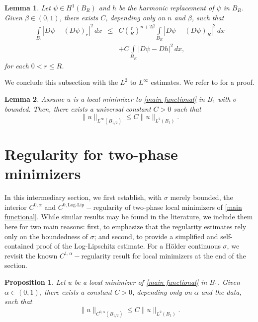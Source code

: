 \documentclass[reqno,11pt]{amsart}
\newtheorem{lemma}{Lemma}[section]
\newtheorem{proposition}{Proposition}[section]
\newcommand{\1}{\mathds{1}}  %
\numberwithin{equation}{section}
\begin{document}
\begin{lemma}\label{decay in terms of harmonic replac}
Let $\psi \in H^1(B_R)$ and $h$ be the harmonic replacement of $\psi$ in $B_R$. Given $\beta \in (0,1)$, there exists $C$, depending only on $n$ and $\beta$, such that 
\begin{eqnarray*}
\int\limits_{B_r}|D\psi-(D\psi)_r|^2 \, dx & \leq & C\left( \frac{r}{R}\right)^{n+2\beta} \int\limits_{B_R}|D\psi-(D\psi)_R|^2 \, dx \\
& & + C\int\limits_{B_R}|D\psi-Dh|^2 \, dx,
\end{eqnarray*}
for each $0<r \leq R$. 
\end{lemma}

We conclude this subsection with the $L^2$ to $L^\infty$ estimates. We refer to \cite[Theorem 7.2]{EG} for a proof.

\begin{lemma}\label{2 to infty bddness}
Assume $u$ is a local minimizer to \eqref{main functional} in $B_1$ with $\sigma$ bounded. Then, there exists a universal constant $C>0$ such that
$$
    \|u\|_{L^\infty(B_{1/2})} \leq C\|u\|_{L^2(B_1)}.
$$
\end{lemma}

\section{Regularity for two-phase minimizers} \label{Reg 2-phase}

In this intermediary section, we first establish, with $\sigma$ merely bounded, the interior $C^{0,\alpha}$ and $C^{0,\text{Log-Lip}}-$regularity of two-phase local minimizers of \eqref{main functional}. While similar results may be found in the literature, we include them here for two main reasons: first, to emphasize that the regularity estimates rely only on the boundedness of $\sigma$; and second, to provide a simplified and self-contained proof of the Log-Lipschitz estimate. For a H\"older continuous $\sigma$, we revisit the known $C^{1,\alpha}-$regularity result for local minimizers at the end of the section.

\begin{proposition}\label{interior holder regularity}
Let $u$ be a local minimizer of \eqref{main functional} in $B_1$. Given $\alpha \in (0,1)$, there exists a constant $C>0$, depending only on $\alpha$ and the data, such that
$$
    \|u\|_{C^{0,\alpha}(B_{1/2})} \leq C\|u\|_{L^2(B_1)}.
$$
\end{proposition}
\end{document}
